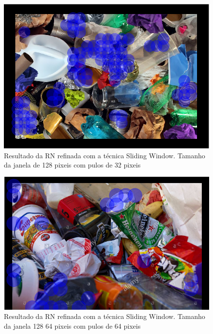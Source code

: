 \documentclass[conference, compsoc, 12pt]{IEEEtran}
\begin{document}
\begin{figure}[H]
    \centering
    \includegraphics[width=.9\linewidth]{trained_128_32.png}
    \caption{Resultado da RN refinada com a técnica Sliding Window. Tamanho da janela de 128 pixeis com pulos de 32 pixeis}
\end{figure}

\begin{figure}[H]
    \centering
    \includegraphics[width=.9\linewidth]{trained2_128_64.png}
    \caption{Resultado da RN refinada com a técnica Sliding Window. Tamanho da janela 128 64 pixeis com pulos de 64 pixeis}
\end{figure}
\end{document}
